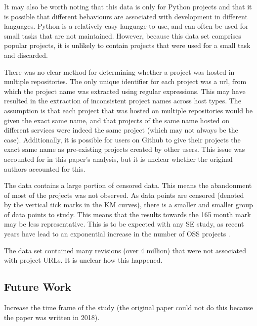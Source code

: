 \documentclass[acmconf]{acmart}
\begin{document}
It may also be worth noting that this data is only for Python projects and that it is possible that different behaviours are associated with development in different languages.
Python is a relatively easy language to use, and can often be used for small tasks that are not maintained.
However, because this data set comprises popular projects, it is unlikely to contain projects that were used for a small task and discarded.

There was no clear method for determining whether a project was hosted in multiple repositories.
The only unique identifier for each project was a url, from which the project name was extracted using regular expressions.
This may have resulted in the extraction of inconsistent project names across host types.
The assumption is that each project that was hosted on multiple repositories would be given the exact same name, and that projects of the same name hosted on different services were indeed the same project (which may not always be the case).
Additionally, it is possible for users on Github to give their projects the exact same name as pre-existing projects created by other users.
This issue was accounted for in this paper's analysis, but it is unclear whether the original authors accounted for this.

The data contains a large portion of censored data.
This means the abandonment of most of the projects was not observed.
As data points are censored (denoted by the vertical tick marks in the KM curves), there is a smaller and smaller group of data points to study.
This means that the results towards the 165 month mark may be less representative.
This is to be expected with any SE study, as recent years have lead to an exponential increase in the number of OSS projects .


The data set contained many revisions (over 4 million) that were not associated with project URLs.
It is unclear how this happened.

\subsection{Future Work} \label{future}


Increase the time frame of the study (the original paper could not do this because the paper was written in 2018).
\end{document}
